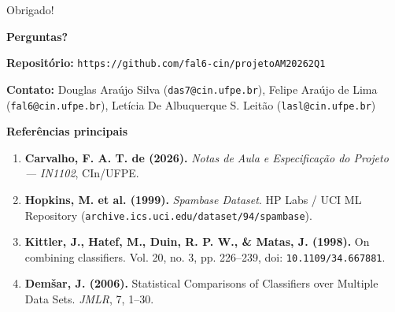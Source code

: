 \documentclass[aspectratio=169,11pt]{beamer}
\begin{document}
\begin{frame}[t]{Obrigado!}
\begin{notabox}[top=1.2mm,bottom=1.2mm,before skip=1mm,after skip=1.5mm]
\centering
{\normalsize\bfseries\color{cinazul}Perguntas?}\par\vspace{0.8mm}
\scriptsize \textbf{Repositório:} \texttt{https://github.com/fal6-cin/projetoAM20262Q1}\par\vspace{0.6mm}
\scriptsize \textbf{Contato:} Douglas Araújo Silva (\texttt{das7@cin.ufpe.br}), Felipe Araújo de Lima (\texttt{fal6@cin.ufpe.br}), Letícia De Albuquerque S. Leitão (\texttt{lasl@cin.ufpe.br})
\end{notabox}
\begin{simplebox}[top=1.2mm,bottom=1.2mm,before skip=1mm,after skip=0mm]
\footnotesize\textbf{Referências principais}\par\vspace{0.6mm}
\scriptsize
\begin{enumerate}\setlength\itemsep{0.6mm}
\item \textbf{Carvalho, F. A. T. de (2026).} \emph{Notas de Aula e Especificação do Projeto — IN1102}, CIn/UFPE.
\item \textbf{Hopkins, M. et al. (1999).} \emph{Spambase Dataset}. HP Labs / UCI ML Repository (\texttt{archive.ics.uci.edu/dataset/94/spambase}).
\item \textbf{Kittler, J., Hatef, M., Duin, R. P. W., \& Matas, J. (1998).} On combining classifiers. Vol. 20, no. 3, pp. 226--239, doi: \texttt{10.1109/34.667881}.
\item \textbf{Dem\v{s}ar, J. (2006).} Statistical Comparisons of Classifiers over Multiple Data Sets. \emph{JMLR}, 7, 1--30.
\end{enumerate}
\end{simplebox}
\end{frame}
\end{document}
